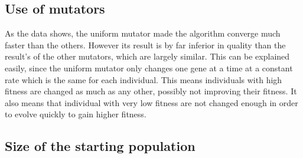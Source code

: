 \documentclass[a4paper,10pt]{article}
\begin{document}
\subsection{Use of mutators}
As the data shows, the uniform mutator made the algorithm converge much faster than the others. However its result is by far inferior in quality than the result's of the other mutators, which are largely similar. This can be explained easily, since the uniform mutator only changes one gene at a time at a constant rate which is the same for each individual. This means individuals with high fitness are changed as much as any other, possibly not improving their fitness. It also means that individual with very low fitness are not changed enough in order to evolve quickly to gain higher fitness.
\subsection{Size of the starting population}
\end{document}
